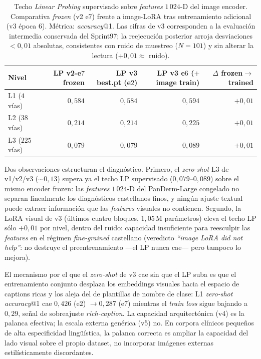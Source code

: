 \begin{table}[H]
\centering
\footnotesize
\setlength{\tabcolsep}{4pt}
\renewcommand{\arraystretch}{0.95}
\caption{Techo \emph{Linear Probing} supervisado sobre
\emph{features} $1\,024$-D del image encoder. Comparativa
\emph{frozen} (v2 e$7$) frente a image-LoRA tras entrenamiento
adicional (v3 época $6$). Métrica: \emph{accuracy}@1. Las
cifras de v3 corresponden a la evaluación intermedia conservada
del Sprint97; la reejecución posterior arroja desviaciones
$< 0{,}01$ absolutas, consistentes con ruido de muestreo
($N = 101$) y sin alterar la lectura ($+0{,}01 \approx$ ruido).}
\label{tab:spanderm-lp-ceiling}
\begin{tabular}{lrrrr}
\hline
Nivel              & LP v2-e$7$ frozen & LP v3 best.pt (e$2$) & LP v3 e$6$ ($+$image train) & $\Delta$ frozen$\to$trained \\
\hline
L1 ($4$ vías)       & $0{,}584$         & $0{,}584$            & $0{,}594$                   & $+0{,}01$                   \\
L2 ($38$ vías)      & $0{,}214$         & $0{,}214$            & $0{,}225$                   & $+0{,}01$                   \\
L3 ($225$ vías)     & $0{,}079$         & $0{,}079$            & $0{,}089$                   & $+0{,}01$                   \\
\hline
\end{tabular}
\end{table}

Dos observaciones estructuran el diagnóstico. Primero, el
\emph{zero-shot} L3 de v1/v2/v3 ($\sim 0{,}13$) supera ya el techo LP
supervisado ($0{,}079$--$0{,}089$) sobre el mismo encoder frozen: las
\emph{features} $1\,024$-D del PanDerm-Large congelado no separan
linealmente los diagnósticos castellanos finos, y ningún ajuste textual
puede extraer información que las \emph{features} visuales no contienen.
Segundo, la LoRA visual de v3 (últimos cuatro bloques, $1{,}05$\,M
parámetros) eleva el techo LP sólo $+0{,}01$ por nivel, dentro del
ruido: capacidad insuficiente para reesculpir las \emph{features} en el
régimen \emph{fine-grained} castellano (veredicto \emph{``image LoRA
did not help''}: no destruye el preentrenamiento ---el LP nunca cae---
pero tampoco lo mejora).

El mecanismo por el que el \emph{zero-shot} de v3 cae sin que el LP
suba es que el entrenamiento conjunto desplaza los embeddings visuales
hacia el espacio de captions ricas y los aleja del de plantillas de
nombre de clase: L1 \emph{zero-shot} \emph{accuracy}@1 cae
$0{,}426$ (e$2$) $\to 0{,}287$ (e$7$) mientras el \emph{train loss}
sigue bajando a $0{,}29$, señal de sobreajuste \emph{rich-caption}. La
capacidad arquitectónica (v4) es la palanca efectiva; la escala externa
genérica (v5) no. En corpora clínicos pequeños de alta especificidad
lingüística, la palanca correcta es ampliar la capacidad del lado
visual sobre el propio dataset, no incorporar imágenes externas
estilísticamente discordantes.

